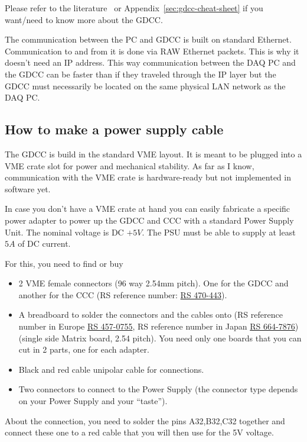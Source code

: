 Please refer to the literature~\cite{GDCC:2012} or
Appendix~\ref{sec:gdcc-cheat-sheet} if you want/need to know more
about the GDCC.

The communication between the PC and GDCC is built on standard
Ethernet. Communication to and from it is done via RAW Ethernet packets. This is
why it doesn't need an IP address. This way communication between the DAQ PC and
the GDCC can be faster than if they traveled through the IP layer but the GDCC
must necessarily be located on the same physical LAN network as the DAQ PC.

\subsection{How to make a power supply cable}
The GDCC is build in the standard VME layout. It is meant to be plugged into a
VME crate slot for power and mechanical stability. As far as I know,
communication with the VME crate is hardware-ready but not implemented in
software yet.

In case you don't have a VME crate at hand you can easily fabricate a specific
power adapter to power up the GDCC and CCC with a standard Power Supply
Unit. The nominal voltage is DC $+5V$. The PSU must be able to supply at least
$5A$ of DC current.

For this, you need to find or buy
\begin{itemize}
\item 2 VME female connectors (96 way 2.54mm pitch). One for the GDCC and
  another for the CCC (RS reference number:
  \href{https://jp.rs-online.com/web/p/din-41612-connectors/0470443/?sra=pstk}{RS
    470-443}).
\item A breadboard to solder the connectors and the cables onto (RS reference
  number in Europe
  \href{https://uk.rs-online.com/web/p/matrix-boards/4570755/}{RS 457-0755}, RS
  reference number in Japan
  \href{https://jp.rs-online.com/web/p/matrix-boards/6647876/?sra=pstk}{RS
    664-7876}) (single side Matrix board, 2.54 pitch). You need only one boards
  that you can cut in 2 parts, one for each adapter.
\item Black and red cable unipolar cable for connections.
\item Two connectors to connect to the Power Supply (the connector type depends
  on your Power Supply and your ``taste'').
\end{itemize}

About the connection, you need to solder the pins A32,B32,C32 together and
connect these one to a red cable that you will then use for the 5V voltage.

